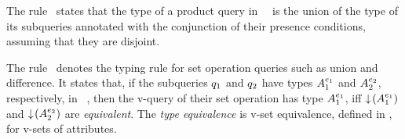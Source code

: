 % 
The rule \productE\ states that the type of a product query in \vctxTxt\
\vctx\ is the union of the type of its subqueries annotated with the 
conjunction of their presence conditions, assuming that 
they are disjoint. 

% 
The rule \setopE\ denotes the typing rule for set operation queries such as 
union and difference. It states that, if the subqueries $\vQ_1$ and $\vQ_2$
have types $\envInContext [\vctx_1] \vType_1$ and 
$\envInContext [\vctx_2] \vType_2$, respectively, in \vctxTxt\ \vctx,
then the v-query of their set operation has type $\envInContext [\vctx_1] \vType_1$, iff 
$\pushIn {\envInContext [\vctx_1] \vType_1}$ and $\pushIn {\envInContext [\vctx_2] \vType_2}$ are \emph{equivalent}.
The \emph{type equivalence} is v-set equivalence, defined in ,
for v-sets of attributes.


 


